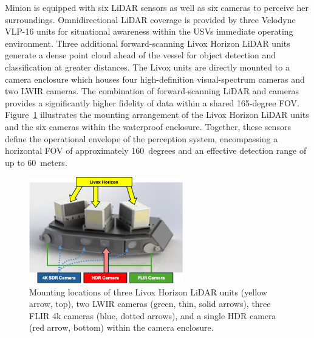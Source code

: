\documentclass{erauthesis}
\begin{document}
Minion is equipped with six \ac{LiDAR} sensors as well as six cameras to perceive her surroundings.
Omnidirectional \ac{LiDAR} coverage is provided by three Velodyne VLP-16 units for situational awareness within the \acp{USV} immediate operating environment.
Three additional forward-scanning Livox Horizon \ac{LiDAR} units generate a dense point cloud ahead of the vessel for object detection and classification at greater distances.
The Livox units are directly mounted to a camera enclosure which houses four high-definition visual-spectrum cameras and two \ac{LWIR} cameras.
The combination of forward-scanning LiDAR and cameras provides a significantly higher fidelity of data within a shared 165-degree \ac{FOV}. %
Figure~\ref{fig:camera_enclosure} illustrates the mounting arrangement of the Livox Horizon LiDAR units and the six cameras within the waterproof enclosure.
Together, these sensors define the operational envelope of the perception system, encompassing a horizontal \ac{FOV} of approximately 160~degrees and an effective detection range of up to 60~meters.

\begin{figure}[htbp]
\centering
\includegraphics[width=0.6\textwidth]{Images/Camera_enclosure2.png}
\caption{Mounting locations of three Livox Horizon LiDAR units (yellow arrow, top), two LWIR cameras (green, thin, solid arrows), three FLIR 4k cameras (blue, dotted arrows), and a single \ac{HDR} camera  (red arrow, bottom) within the camera enclosure.}
\label{fig:camera_enclosure}
\end{figure}
\end{document}
